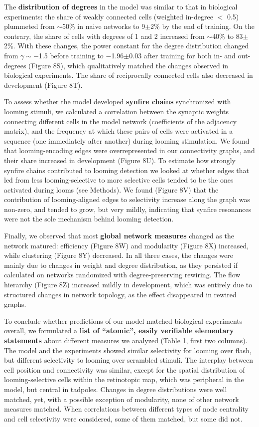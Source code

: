 \documentclass{article}
\begin{document}
The \textbf{distribution of degrees} in the model was similar to that in biological experiments: the share of weakly connected cells (weighted in-degree $<$ 0.5) plummeted from $\sim$50\% in naive networks to 9$\pm$2\% by the end of training. On the contrary, the share of cells with degrees of 1 and 2 increased from $\sim$40\% to 83$\pm$2\%. With these changes, the power constant for the degree distribution changed from $\gamma \sim -$1.5 before training to $-$1.96$\pm$0.03 after training for both in- and out-degrees (Figure 8S), which qualitatively matched the changes observed in biological experiments. The share of reciprocally connected cells also decreased in development (Figure 8T).

To assess whether the model developed \textbf{synfire chains} synchronized with looming stimuli, we calculated a correlation between the synaptic weights connecting different cells in the model network (coefficients of the adjacency matrix), and the frequency at which these pairs of cells were activated in a sequence (one immediately after another) during looming stimulation. We found that looming-encoding edges were overrepresented in our connectivity graphs, and their share increased in development (Figure 8U). To estimate how strongly synfire chains contributed to looming detection we looked at whether edges that led from less looming-selective to more selective cells tended to be the ones activated during looms (see Methods). We found (Figure 8V) that the contribution of looming-aligned edges to selectivity increase along the graph was non-zero, and tended to grow, but very mildly, indicating that synfire resonances were not the sole mechanism behind looming detection.

Finally, we observed that most \textbf{global network measures} changed as the network matured: efficiency (Figure 8W) and modularity (Figure 8X) increased, while clustering (Figure 8Y) decreased. In all three cases, the changes were mainly due to changes in weight and degree distribution, as they persisted if calculated on networks randomized with degree-preserving rewiring. The flow hierarchy (Figure 8Z) increased mildly in development, which was entirely due to structured changes in network topology, as the effect disappeared in rewired graphs.

To conclude whether predictions of our model matched biological experiments overall, we formulated a \textbf{list of “atomic”, easily verifiable elementary statements} about different measures we analyzed (Table 1, first two columns). The model and the experiments showed similar selectivity for looming over flash, but different selectivity to looming over scrambled stimuli. The interplay between cell position and connectivity was similar, except for the spatial distribution of looming-selective cells within the retinotopic map, which was peripheral in the model, but central in tadpoles. Changes in degree distributions were well matched, yet, with a possible exception of modularity, none of other network measures matched. When correlations between different types of node centrality and cell selectivity were considered, some of them matched, but some did not.
\end{document}

